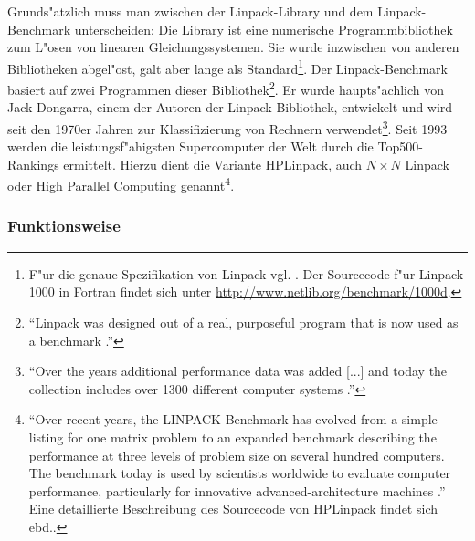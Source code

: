 Grunds"atzlich muss man zwischen der Linpack-Library und dem Linpack-Benchmark unterscheiden: Die Library ist eine numerische Programmbibliothek zum L"osen von linearen Gleichungssystemen. Sie wurde inzwischen von anderen Bibliotheken abgel"ost, galt aber lange als Standard\footnote{F"ur die genaue Spezifikation von Linpack vgl. \cite{don03}. Der Sourcecode f"ur Linpack 1000 in Fortran findet sich unter \url{http://www.netlib.org/benchmark/1000d}.}. Der Linpack-Benchmark basiert auf zwei Programmen dieser Bibliothek\footnote{"`Linpack was designed out of a real, purposeful program that is now used as a benchmark \cite{wei90}."'}. Er wurde haupts"achlich von Jack Dongarra, einem der Autoren der Linpack-Bibliothek, entwickelt und wird seit den 1970er Jahren zur Klassifizierung von Rechnern verwendet\footnote{"`Over the years additional performance data was added [...] and today the collection includes over 1300 different computer systems \cite{don03}."'}. Seit 1993 werden die leistungsf"ahigsten Supercomputer der Welt durch die Top500-Rankings ermittelt. Hierzu dient die Variante HPLinpack, auch $N\times N$ Linpack oder High Parallel Computing genannt\footnote{"`Over recent years, the LINPACK Benchmark has evolved from a simple listing for one matrix problem to an expanded benchmark describing the performance at three levels of problem size on several hundred computers. The benchmark today is used by scientists worldwide to evaluate computer performance, particularly for innovative advanced-architecture machines \cite{don03}."' Eine detaillierte Beschreibung des Sourcecode von HPLinpack findet sich ebd..}. 




\subsubsection{Funktionsweise}\label{Funktionsweise Linpack}

